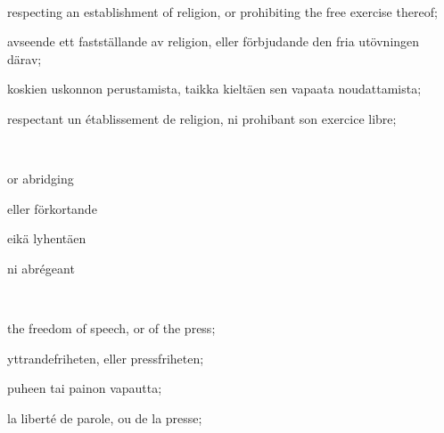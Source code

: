 \documentclass[a4paper,landscape,12pt]{article}
\begin{document}
~

\begin{minipage}[t]{0.22\textwidth}
 respecting an establishment of religion, or prohibiting the free exercise thereof;
\end{minipage}\textwidth
\begin{minipage}[t]{0.22\textwidth}
avseende ett fastställande av religion, eller förbjudande den fria utövningen därav;
\end{minipage}\textwidth
\begin{minipage}[t]{0.22\textwidth}
 koskien uskonnon perustamista, taikka kieltäen sen vapaata noudattamista;
\end{minipage}\textwidth
\begin{minipage}[t]{0.22\textwidth}
respectant un établissement de religion, ni prohibant son exercice libre;
\end{minipage}

~

\begin{minipage}[t]{0.22\textwidth}
or abridging
\end{minipage}\textwidth
\begin{minipage}[t]{0.22\textwidth}
eller förkortande
\end{minipage}\textwidth
\begin{minipage}[t]{0.22\textwidth}
eikä lyhentäen
\end{minipage}\textwidth
\begin{minipage}[t]{0.22\textwidth}
ni abrégeant
\end{minipage}

~

\begin{minipage}[t]{0.22\textwidth}
	the freedom of speech, or of the press;
\end{minipage}\textwidth
\begin{minipage}[t]{0.22\textwidth}
	yttrandefriheten, eller pressfriheten;
\end{minipage}\textwidth
\begin{minipage}[t]{0.22\textwidth}
	puheen tai painon vapautta;
\end{minipage}\textwidth
\begin{minipage}[t]{0.22\textwidth}
la liberté de parole, ou de la presse;
\end{minipage}
\end{document}
